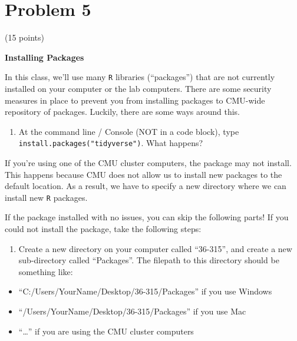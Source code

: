 \documentclass[]{article}
\providecommand{\tightlist}{%
  \setlength{\itemsep}{0pt}\setlength{\parskip}{0pt}}
\begin{document}
\hypertarget{problem-5}{%
\section{Problem 5}\label{problem-5}}

(15 points)

\textbf{Installing Packages}

In this class, we'll use many \texttt{R} libraries (``packages'') that
are not currently installed on your computer or the lab computers. There
are some security measures in place to prevent you from installing
packages to CMU-wide repository of packages. Luckily, there are some
ways around this.

\begin{enumerate}
\def\labelenumi{\alph{enumi}.}
\tightlist
\item
  At the command line / Console (NOT in a code block), type
  \texttt{install.packages("tidyverse")}. What happens?
\end{enumerate}

If you're using one of the CMU cluster computers, the package may not
install. This happens because CMU does not allow us to install new
packages to the default location. As a result, we have to specify a new
directory where we can install new \texttt{R} packages.

If the package installed with no issues, you can skip the following
parts! If you could not install the package, take the following steps:

\begin{enumerate}
\def\labelenumi{\alph{enumi}.}
\setcounter{enumi}{1}
\tightlist
\item
  Create a new directory on your computer called ``36-315'', and create
  a new sub-directory called ``Packages''. The filepath to this
  directory should be something like:
\end{enumerate}

\begin{itemize}
\tightlist
\item
  ``C:/Users/YourName/Desktop/36-315/Packages'' if you use Windows
\item
  ``/Users/YourName/Desktop/36-315/Packages'' if you use Mac
\item
  ``\ldots{}'' if you are using the CMU cluster computers
\end{itemize}
\end{document}
